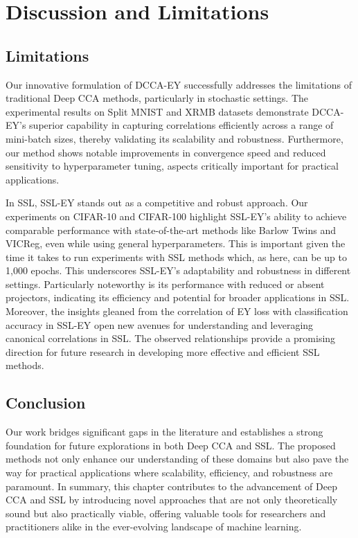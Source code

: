 \section{Discussion and Limitations}

\subsection{Limitations}

Our innovative formulation of DCCA-EY successfully addresses the limitations of traditional Deep CCA methods, particularly in stochastic settings.
The experimental results on Split MNIST and XRMB datasets demonstrate DCCA-EY's superior capability in capturing correlations efficiently across a range of mini-batch sizes, thereby validating its scalability and robustness.
Furthermore, our method shows notable improvements in convergence speed and reduced sensitivity to hyperparameter tuning, aspects critically important for practical applications.

In SSL, SSL-EY stands out as a competitive and robust approach.
Our experiments on CIFAR-10 and CIFAR-100 highlight SSL-EY's ability to achieve comparable performance with state-of-the-art methods like Barlow Twins and VICReg, even while using general hyperparameters.
This is important given the time it takes to run experiments with SSL methods which, as here, can be up to 1,000 epochs.
This underscores SSL-EY's adaptability and robustness in different settings.
Particularly noteworthy is its performance with reduced or absent projectors, indicating its efficiency and potential for broader applications in SSL\@.
Moreover, the insights gleaned from the correlation of EY loss with classification accuracy in SSL-EY open new avenues for understanding and leveraging canonical correlations in SSL. The observed relationships provide a promising direction for future research in developing more effective and efficient SSL methods.

\subsection{Conclusion}

Our work bridges significant gaps in the literature and establishes a strong foundation for future explorations in both Deep CCA and SSL. The proposed methods not only enhance our understanding of these domains but also pave the way for practical applications where scalability, efficiency, and robustness are paramount.
In summary, this chapter contributes to the advancement of Deep CCA and SSL by introducing novel approaches that are not only theoretically sound but also practically viable, offering valuable tools for researchers and practitioners alike in the ever-evolving landscape of machine learning.